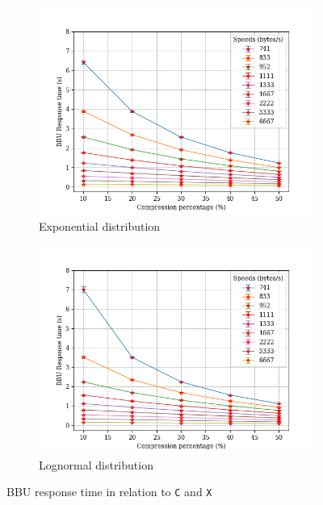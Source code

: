 \documentclass[11pt,a4paper,oneside, openright]{article}
\begin{document}
\begin{figure}[h]
	\centering
	\begin{subfigure}{.5\textwidth}
		\centering
		\includegraphics[width=\linewidth]{images/c-vs-response-time-bbu-exp}
		\caption{Exponential distribution}
		\label{fig:c-vs-response-time-bbu-exp}
	\end{subfigure}%
	\begin{subfigure}{.5\textwidth}
		\centering
		\includegraphics[width=\linewidth]{images/c-vs-response-time-bbu-logn}
		\caption{Lognormal distribution}
		\label{fig:c-vs-response-time-bbu-logn}
	\end{subfigure}
	\caption{BBU response time in relation to \texttt{C} and \texttt{X}}
	\label{fig:c-vs-response-time-bbu}
\end{figure}
\end{document}

